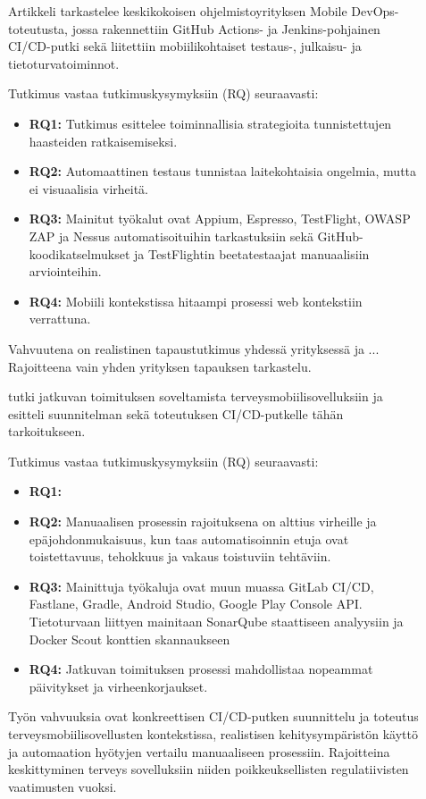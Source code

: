 \documentclass[bscthesis,finnish,oneside,biblatex]{uefcsthesis}
\begin{document}
\begin{description}
    \item[\cite{ozdenizci2024mobilizing}] Artikkeli tarkastelee keskikokoisen ohjelmistoyrityksen Mobile DevOps-toteutusta, jossa rakennettiin GitHub Actions- ja Jenkins-pohjainen CI/CD-putki sekä liitettiin mobiilikohtaiset testaus-, julkaisu- ja tietoturvatoiminnot.

    Tutkimus vastaa tutkimuskysymyksiin (RQ) seuraavasti:
    \begin{itemize}
        \item \textbf{RQ1:} Tutkimus esittelee toiminnallisia strategioita tunnistettujen haasteiden ratkaisemiseksi.
        \item \textbf{RQ2:} Automaattinen testaus tunnistaa laitekohtaisia ongelmia, mutta ei visuaalisia virheitä.
        \item \textbf{RQ3:} Mainitut työkalut ovat Appium, Espresso, TestFlight, OWASP ZAP ja Nessus automatisoituihin tarkastuksiin sekä GitHub-koodikatselmukset ja TestFlightin beetatestaajat manuaalisiin arviointeihin.
        \item \textbf{RQ4:} Mobiili kontekstissa hitaampi prosessi web kontekstiin verrattuna.
    \end{itemize}

    Vahvuutena on realistinen tapaustutkimus yhdessä yrityksessä ja ...
    Rajoitteena vain yhden yrityksen tapauksen tarkastelu.
\end{description}

\begin{description}
    \item[\cite{byman2024continuous}] tutki jatkuvan toimituksen soveltamista terveysmobiilisovelluksiin ja esitteli suunnitelman sekä toteutuksen CI/CD-putkelle tähän tarkoitukseen.

    Tutkimus vastaa tutkimuskysymyksiin (RQ) seuraavasti:
    \begin{itemize}
        \item \textbf{RQ1:}
        \item \textbf{RQ2:} Manuaalisen prosessin rajoituksena on alttius virheille ja epäjohdonmukaisuus, kun taas automatisoinnin etuja ovat toistettavuus, tehokkuus ja vakaus toistuviin tehtäviin.
        \item \textbf{RQ3:} Mainittuja työkaluja ovat muun muassa GitLab CI/CD, Fastlane, Gradle, Android Studio, Google Play Console API. Tietoturvaan liittyen mainitaan SonarQube staattiseen analyysiin ja Docker Scout konttien skannaukseen
        \item \textbf{RQ4:} Jatkuvan toimituksen prosessi mahdollistaa nopeammat päivitykset ja virheenkorjaukset.
    \end{itemize}

    Työn vahvuuksia ovat konkreettisen CI/CD-putken suunnittelu ja toteutus terveysmobiilisovellusten kontekstissa, realistisen kehitysympäristön käyttö ja automaation hyötyjen vertailu manuaaliseen prosessiin. Rajoitteina keskittyminen terveys sovelluksiin niiden poikkeuksellisten regulatiivisten vaatimusten vuoksi.
\end{description}
\end{document}

